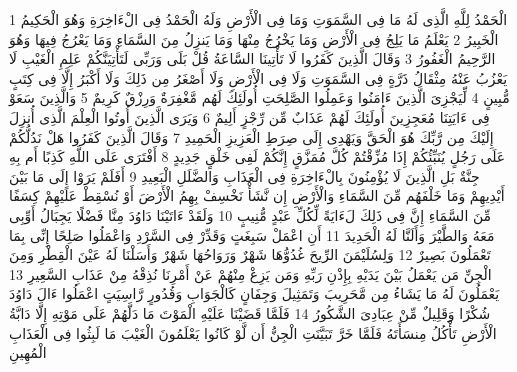 \documentclass[20pt,a4paper]{article}
\title{}
\author{}
\date{}
\begin{document}
\pagecolor{cl_page}



{\tiny\colorbox{cl_aya}{1}} الْحَمْدُ لِلَّهِ الَّذِى لَهُ مَا فِى السَّمَوَتِ وَمَا فِى الْأَرْضِ وَلَهُ الْحَمْدُ فِى الْءَاخِرَةِ وَهُوَ الْحَكِيمُ الْخَبِيرُ
{\tiny\colorbox{cl_aya}{2}} يَعْلَمُ مَا يَلِجُ فِى الْأَرْضِ وَمَا يَخْرُجُ مِنْهَا وَمَا يَنزِلُ مِنَ السَّمَاءِ وَمَا يَعْرُجُ فِيهَا وَهُوَ الرَّحِيمُ الْغَفُورُ
{\tiny\colorbox{cl_aya}{3}} وَقَالَ الَّذِينَ كَفَرُوا لَا تَأْتِينَا السَّاعَةُ قُلْ بَلَى وَرَبِّى لَتَأْتِيَنَّكُمْ عَلِمِ الْغَيْبِ لَا يَعْزُبُ عَنْهُ مِثْقَالُ ذَرَّةٍ فِى السَّمَوَتِ وَلَا فِى الْأَرْضِ وَلَا أَصْغَرُ مِن ذَلِكَ وَلَا أَكْبَرُ إِلَّا فِى كِتَبٍ مُّبِينٍ
{\tiny\colorbox{cl_aya}{4}} لِّيَجْزِىَ الَّذِينَ ءَامَنُوا وَعَمِلُوا الصَّلِحَتِ أُولَئِكَ لَهُم مَّغْفِرَةٌ وَرِزْقٌ كَرِيمٌ
{\tiny\colorbox{cl_aya}{5}} وَالَّذِينَ سَعَوْ فِى ءَايَتِنَا مُعَجِزِينَ أُولَئِكَ لَهُمْ عَذَابٌ مِّن رِّجْزٍ أَلِيمٌ
{\tiny\colorbox{cl_aya}{6}} وَيَرَى الَّذِينَ أُوتُوا الْعِلْمَ الَّذِى أُنزِلَ إِلَيْكَ مِن رَّبِّكَ هُوَ الْحَقَّ وَيَهْدِى إِلَى صِرَطِ الْعَزِيزِ الْحَمِيدِ
{\tiny\colorbox{cl_aya}{7}} وَقَالَ الَّذِينَ كَفَرُوا هَلْ نَدُلُّكُمْ عَلَى رَجُلٍ يُنَبِّئُكُمْ إِذَا مُزِّقْتُمْ كُلَّ مُمَزَّقٍ إِنَّكُمْ لَفِى خَلْقٍ جَدِيدٍ
{\tiny\colorbox{cl_aya}{8}} أَفْتَرَى عَلَى اللَّهِ كَذِبًا أَم بِهِ جِنَّةٌ بَلِ الَّذِينَ لَا يُؤْمِنُونَ بِالْءَاخِرَةِ فِى الْعَذَابِ وَالضَّلَلِ الْبَعِيدِ
{\tiny\colorbox{cl_aya}{9}} أَفَلَمْ يَرَوْا إِلَى مَا بَيْنَ أَيْدِيهِمْ وَمَا خَلْفَهُم مِّنَ السَّمَاءِ وَالْأَرْضِ إِن نَّشَأْ نَخْسِفْ بِهِمُ الْأَرْضَ أَوْ نُسْقِطْ عَلَيْهِمْ كِسَفًا مِّنَ السَّمَاءِ إِنَّ فِى ذَلِكَ لَءَايَةً لِّكُلِّ عَبْدٍ مُّنِيبٍ
{\tiny\colorbox{cl_aya}{10}} وَلَقَدْ ءَاتَيْنَا دَاوُدَ مِنَّا فَضْلًا يَجِبَالُ أَوِّبِى مَعَهُ وَالطَّيْرَ وَأَلَنَّا لَهُ الْحَدِيدَ
{\tiny\colorbox{cl_aya}{11}} أَنِ اعْمَلْ سَبِغَتٍ وَقَدِّرْ فِى السَّرْدِ وَاعْمَلُوا صَلِحًا إِنِّى بِمَا تَعْمَلُونَ بَصِيرٌ
{\tiny\colorbox{cl_aya}{12}} وَلِسُلَيْمَنَ الرِّيحَ غُدُوُّهَا شَهْرٌ وَرَوَاحُهَا شَهْرٌ وَأَسَلْنَا لَهُ عَيْنَ الْقِطْرِ وَمِنَ الْجِنِّ مَن يَعْمَلُ بَيْنَ يَدَيْهِ بِإِذْنِ رَبِّهِ وَمَن يَزِغْ مِنْهُمْ عَنْ أَمْرِنَا نُذِقْهُ مِنْ عَذَابِ السَّعِيرِ
{\tiny\colorbox{cl_aya}{13}} يَعْمَلُونَ لَهُ مَا يَشَاءُ مِن مَّحَرِيبَ وَتَمَثِيلَ وَجِفَانٍ كَالْجَوَابِ وَقُدُورٍ رَّاسِيَتٍ اعْمَلُوا ءَالَ دَاوُدَ شُكْرًا وَقَلِيلٌ مِّنْ عِبَادِىَ الشَّكُورُ
{\tiny\colorbox{cl_aya}{14}} فَلَمَّا قَضَيْنَا عَلَيْهِ الْمَوْتَ مَا دَلَّهُمْ عَلَى مَوْتِهِ إِلَّا دَابَّةُ الْأَرْضِ تَأْكُلُ مِنسَأَتَهُ فَلَمَّا خَرَّ تَبَيَّنَتِ الْجِنُّ أَن لَّوْ كَانُوا يَعْلَمُونَ الْغَيْبَ مَا لَبِثُوا فِى الْعَذَابِ الْمُهِينِ
\end{document}
